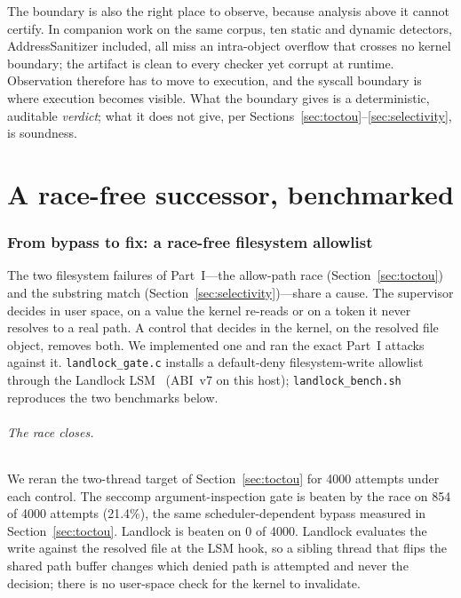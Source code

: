 \documentclass[11pt]{article}
\newcommand{\Nrace}{4000}
\newcommand{\RaceHi}{21.4}
\begin{document}
The boundary is also the right place to observe, because analysis above it cannot certify. In companion
work on the same corpus, ten static and dynamic detectors, AddressSanitizer included, all miss an
intra-object overflow that crosses no kernel boundary; the artifact is clean to every checker yet
corrupt at runtime. Observation therefore has to move to execution, and the syscall boundary is where
execution becomes visible. What the boundary gives is a deterministic, auditable \emph{verdict}; what it
does not give, per Sections~\ref{sec:toctou}--\ref{sec:selectivity}, is soundness.

\part{A race-free successor, benchmarked}

\section{From bypass to fix: a race-free filesystem allowlist}\label{sec:landlock}

The two filesystem failures of Part~I---the allow-path race (Section~\ref{sec:toctou}) and the substring
match (Section~\ref{sec:selectivity})---share a cause. The supervisor decides in user space, on a value
the kernel re-reads or on a token it never resolves to a real path. A control that decides in the kernel,
on the resolved file object, removes both. We implemented one and ran the exact Part~I attacks against it.
\texttt{landlock\_gate.c} installs a default-deny filesystem-write allowlist through the Landlock
LSM~\cite{landlock} (ABI~v7 on this host); \texttt{landlock\_bench.sh} reproduces the two benchmarks below.

\paragraph{The race closes.} We reran the two-thread target of Section~\ref{sec:toctou} for \Nrace{}
attempts under each control. The seccomp argument-inspection gate is beaten by the race on 854 of \Nrace{}
attempts (\RaceHi\%), the same scheduler-dependent bypass measured in Section~\ref{sec:toctou}. Landlock
is beaten on 0 of \Nrace{}. Landlock evaluates the write against the resolved file at the LSM hook, so a
sibling thread that flips the shared path buffer changes which denied path is attempted and never the
decision; there is no user-space check for the kernel to invalidate.
\end{document}
